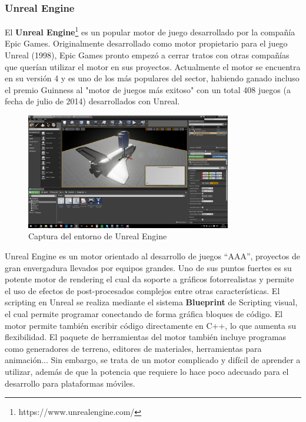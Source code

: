\subsubsection{Unreal Engine}
El \textbf{Unreal Engine}\footnote{https://www.unrealengine.com/} es un popular motor de juego desarrollado por la compañía Epic Games. Originalmente desarrollado como motor propietario para el juego Unreal (1998), Epic Games pronto empezó a cerrar tratos con otras compañías que querían utilizar el motor en sus proyectos. Actualmente el motor se encuentra en su versión 4 y es uno de los más populares del sector, habiendo ganado incluso el premio Guinness al "motor de juegos más exitoso" con un total 408 juegos (a fecha de julio de 2014) desarrollados con Unreal. 
\begin{figure}[h]
	\includegraphics[width=0.8\textwidth]{images/estadodelarte/motores/captura-unreal}
	\centering
	\caption{Captura del entorno de Unreal Engine}
\end{figure}

Unreal Engine es un motor orientado al desarrollo de juegos ``AAA'', proyectos de gran envergadura llevados por equipos grandes. Uno de sus puntos fuertes es su potente motor de rendering el cual da soporte a gráficos fotorrealistas y permite el uso de efectos de post-procesados complejos entre otras características. El scripting en Unreal se realiza mediante el sistema \textbf{Blueprint} de Scripting visual, el cual permite programar conectando de forma gráfica bloques de código. El motor permite también escribir código directamente en C++, lo que aumenta su flexibilidad. El paquete de herramientas del motor también incluye programas como generadores de terreno, editores de materiales, herramientas para animación... Sin embargo, se trata de un motor complicado y difícil de aprender a utilizar, además de que la potencia que requiere lo hace poco adecuado para el desarrollo para plataformas móviles.

